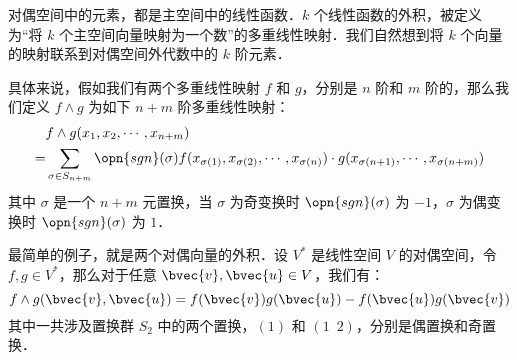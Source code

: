 对偶空间中的元素，都是主空间中的线性函数．$k$ 个线性函数的外积，被定义为“将 $k$ 个主空间向量映射为一个数”的多重线性映射．我们自然想到将 $k$ 个向量的映射联系到对偶空间外代数中的 $k$ 阶元素．

具体来说，假如我们有两个多重线性映射 $f$ 和 $g$，分别是 $n$ 阶和 $m$ 阶的，那么我们定义 $f\wedge g$ 为如下 $n+m$ 阶多重线性映射：
\begin{equation}
\begin{aligned}
&f\wedge g(x_1, x_2, \cdots, x_{n+m})\\=
&\sum\limits_{\sigma\in S_{n+m}}\opn{sgn}(\sigma) f(x_{\sigma(1)}, x_{\sigma(2)}, \cdots, x_{\sigma(n)})\cdot g(x_{\sigma(n+1)}, \cdots, x_{\sigma(n+m)})
\end{aligned}
\end{equation}
其中 $\sigma$ 是一个 $n+m$ 元置换，当 $\sigma$ 为奇变换时 $\opn{sgn}(\sigma)$ 为 $-1$，$\sigma$ 为偶变换时 $\opn{sgn}(\sigma)$ 为 $1$．

最简单的例子，就是两个对偶向量的外积．设 $V^*$ 是线性空间 $V$ 的对偶空间，令 $f, g\in V^*$，那么对于任意 $\bvec{v}, \bvec{u}\in V$，我们有：
\begin{equation}
f\wedge g(\bvec{v}, \bvec{u})=f(\bvec{v})g(\bvec{u})-f(\bvec{u})g(\bvec{v})
\end{equation}
其中一共涉及置换群 $S_2$ 中的两个置换，$(1)$ 和 $(1\phantom{2}2)$，分别是偶置换和奇置换．
